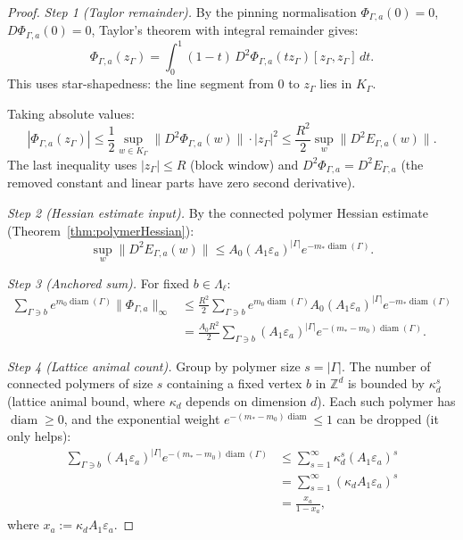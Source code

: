\documentclass[12pt]{article}
\theoremstyle{plain}
\theoremstyle{definition}
\numberwithin{equation}{section}
\newcommand{\Z}{\mathbb{Z}}
\newcommand{\diam}{\operatorname{diam}}
\begin{document}
\begin{proof}
\emph{Step 1 (Taylor remainder).}
By the pinning normalisation $\Phi_{\Gamma,a}(0)=0$, $D\Phi_{\Gamma,a}(0)=0$, Taylor's theorem with integral remainder gives:
\begin{equation}
\Phi_{\Gamma,a}(z_\Gamma) = \int_0^1(1-t)\,D^2\Phi_{\Gamma,a}(tz_\Gamma)[z_\Gamma,z_\Gamma]\,dt.
\end{equation}
This uses star-shapedness: the line segment from $0$ to $z_\Gamma$ lies in $K_\Gamma$.

Taking absolute values:
\begin{equation}
|\Phi_{\Gamma,a}(z_\Gamma)| \leq \frac{1}{2}\sup_{w\in K_\Gamma}\|D^2\Phi_{\Gamma,a}(w)\|\cdot|z_\Gamma|^2 \leq \frac{R^2}{2}\sup_w\|D^2 E_{\Gamma,a}(w)\|.
\end{equation}
The last inequality uses $|z_\Gamma|\leq R$ (block window) and $D^2\Phi_{\Gamma,a}=D^2 E_{\Gamma,a}$ (the removed constant and linear parts have zero second derivative).

\emph{Step 2 (Hessian estimate input).}
By the connected polymer Hessian estimate (Theorem~\ref{thm:polymerHessian}):
\begin{equation}
\sup_w\|D^2 E_{\Gamma,a}(w)\| \leq A_0(A_1\varepsilon_a)^{|\Gamma|}e^{-m_*\diam(\Gamma)}.
\end{equation}

\emph{Step 3 (Anchored sum).}
For fixed $b\in\Lambda_\ell$:
\begin{align}
\sum_{\Gamma\ni b}e^{m_0\diam(\Gamma)}\|\Phi_{\Gamma,a}\|_\infty
&\leq \frac{R^2}{2}\sum_{\Gamma\ni b}e^{m_0\diam(\Gamma)}A_0(A_1\varepsilon_a)^{|\Gamma|}e^{-m_*\diam(\Gamma)}\\
&= \frac{A_0 R^2}{2}\sum_{\Gamma\ni b}(A_1\varepsilon_a)^{|\Gamma|}e^{-(m_*-m_0)\diam(\Gamma)}.
\end{align}

\emph{Step 4 (Lattice animal count).}
Group by polymer size $s=|\Gamma|$.  The number of connected polymers of size $s$ containing a fixed vertex $b$ in $\Z^d$ is bounded by $\kappa_d^s$ (lattice animal bound, where $\kappa_d$ depends on dimension $d$).  Each such polymer has $\diam\geq 0$, and the exponential weight $e^{-(m_*-m_0)\diam}\leq 1$ can be dropped (it only helps):
\begin{align}
\sum_{\Gamma\ni b}(A_1\varepsilon_a)^{|\Gamma|}e^{-(m_*-m_0)\diam(\Gamma)}
&\leq \sum_{s=1}^\infty\kappa_d^s(A_1\varepsilon_a)^s\\
&= \sum_{s=1}^\infty(\kappa_d A_1\varepsilon_a)^s\\
&= \frac{x_a}{1-x_a},
\end{align}
where $x_a:=\kappa_d A_1\varepsilon_a$.


\end{proof}
\end{document}
